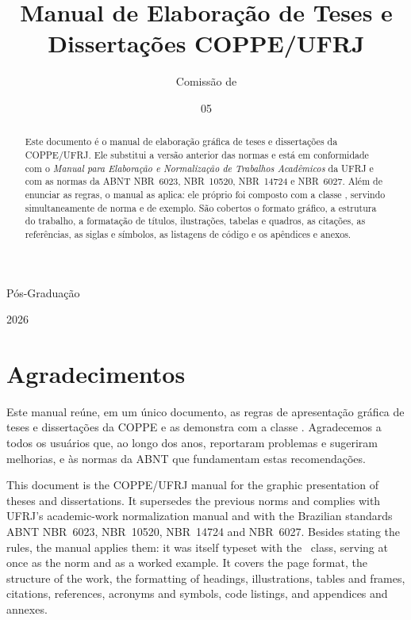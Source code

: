 \documentclass[dsc]{coppe}
\begin{document}
  \title{Manual de Elaboração de Teses e Dissertações COPPE/UFRJ}
  \author{Comissão de}{Pós-Graduação}
  \date{05}{2026}


  \maketitle

  \frontmatter
  \dedication{A toda a comunidade da COPPE, que faz da pós-graduação em
  engenharia uma referência.}

  \chapter*{Agradecimentos}

  Este manual reúne, em um único documento, as regras de apresentação gráfica de
  teses e dissertações da COPPE e as demonstra com a classe \CoppeTeX.
  Agradecemos a todos os usuários que, ao longo dos anos, reportaram problemas e
  sugeriram melhorias, e às normas da ABNT que fundamentam estas recomendações.

  \begin{abstract}

  Este documento é o manual de elaboração gráfica de teses e dissertações da
  COPPE/UFRJ. Ele substitui a versão anterior das normas e está em conformidade
  com o \emph{Manual para Elaboração e Normalização de Trabalhos Acadêmicos} da
  UFRJ e com as normas da ABNT \mbox{NBR~6023}, \mbox{NBR~10520},
  \mbox{NBR~14724} e \mbox{NBR~6027}. Além de enunciar as regras, o manual as
  aplica: ele próprio foi composto com a classe \CoppeTeX, servindo
  simultaneamente de norma e de exemplo. São cobertos o formato gráfico, a
  estrutura do trabalho, a formatação de títulos, ilustrações, tabelas e quadros,
  as citações, as referências, as siglas e símbolos, as listagens de código e os
  apêndices e anexos.

  \end{abstract}

  \begin{foreignabstract}

  This document is the COPPE/UFRJ manual for the graphic presentation of theses
  and dissertations. It supersedes the previous norms and complies with UFRJ's
  academic-work normalization manual and with the Brazilian standards ABNT
  NBR~6023, NBR~10520, NBR~14724 and NBR~6027. Besides stating the rules, the
  manual applies them: it was itself typeset with the \CoppeTeX\ class, serving
  at once as the norm and as a worked example. It covers the page format, the
  structure of the work, the formatting of headings, illustrations, tables and
  frames, citations, references, acronyms and symbols, code listings, and
  appendices and annexes.

  \end{foreignabstract}
\end{document}
